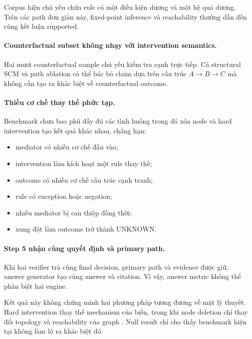 Corpus hiện chủ yếu chứa rule có một điều kiện dương và một hệ quả dương.
Trên các path đơn giản này, fixed-point inference và reachability thường dẫn
đến cùng kết luận supported.

\paragraph{Counterfactual subset không nhạy với intervention semantics.}

Hai mươi counterfactual sample chủ yếu kiểm tra cạnh trực tiếp. Cả structural
SCM và path ablation có thể bác bỏ claim dựa trên cấu trúc
\(A \rightarrow B \rightarrow C\) mà không cần tạo ra khác biệt về
counterfactual outcome.

\paragraph{Thiếu cơ chế thay thế phức tạp.}

Benchmark chưa bao phủ đầy đủ các tình huống trong đó xóa node và hard
intervention tạo kết quả khác nhau, chẳng hạn:

\begin{itemize}
    \item mediator có nhiều cơ chế đầu vào;
    \item intervention làm kích hoạt một rule thay thế;
    \item outcome có nhiều cơ chế cấu trúc cạnh tranh;
    \item rule có exception hoặc negation;
    \item nhiều mediator bị can thiệp đồng thời;
    \item xung đột làm outcome trở thành \(\mathrm{UNKNOWN}\).
\end{itemize}

\paragraph{Step 5 nhận cùng quyết định và primary path.}

Khi hai verifier trả cùng final decision, primary path và evidence được giữ,
answer generator tạo cùng answer và citation. Vì vậy, answer metric không
thể phân biệt hai engine.

Kết quả này không chứng minh hai phương pháp tương đương về mặt lý thuyết.
Hard intervention thay thế mechanism của biến, trong khi node deletion chỉ
thay đổi topology và reachability của graph
\cite{pearl2009causality}. Null result chỉ cho thấy benchmark hiện tại không
làm lộ ra khác biệt đó.

